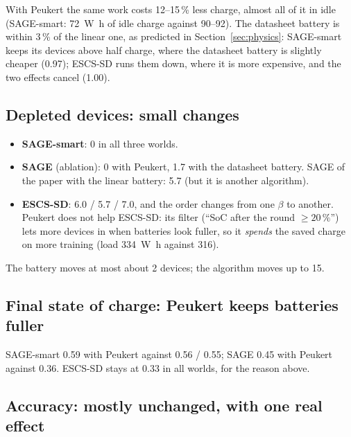 \documentclass[11pt,a4paper]{article}
\begin{document}
With Peukert the same work costs 12--15\,\% less charge, almost all of it in
idle (SAGE-smart: \SI{72}{\watt\hour} of idle charge against 90--92). The
datasheet battery is within 3\,\% of the linear one, as predicted in
Section~\ref{sec:physics}: SAGE-smart keeps its devices above half charge,
where the datasheet battery is slightly cheaper (0.97); ESCS-SD runs them
down, where it is more expensive, and the two effects cancel (1.00).

\subsection{Depleted devices: small changes}

\begin{itemize}
  \item \textbf{SAGE-smart}: 0 in all three worlds.
  \item \textbf{SAGE} (ablation): 0 with Peukert, 1.7 with the datasheet battery.
        SAGE of the paper with the linear battery: 5.7 (but it is another
        algorithm).
  \item \textbf{ESCS-SD}: 6.0 / 5.7 / 7.0, and the order changes from one
        $\beta$ to another. Peukert does not help ESCS-SD: its filter
        (\enquote{SoC after the round $\ge 20\,\%$}) lets more devices in when
        batteries look fuller, so it \emph{spends} the saved charge on more
        training (load \SI{334}{\watt\hour} against 316).
\end{itemize}
The battery moves at most about 2 devices; the algorithm moves up to 15.

\subsection{Final state of charge: Peukert keeps batteries fuller}

SAGE-smart 0.59 with Peukert against 0.56 / 0.55; SAGE 0.45 with Peukert
against 0.36. ESCS-SD stays at 0.33 in all worlds, for the reason above.

\subsection{Accuracy: mostly unchanged, with one real effect}
\end{document}
